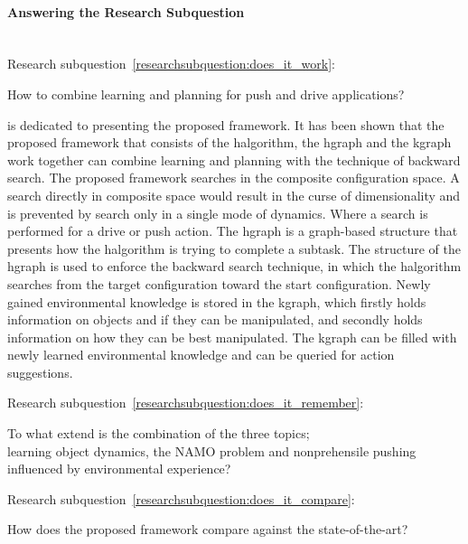 
\paragraph{Answering the Research Subquestion}\mbox{}\\

Research subquestion~\ref{researchsubquestion:does_it_work}:
\begin{center}
\large How to combine learning and planning for push and drive applications?
\end{center}



 is dedicated to presenting the proposed framework. It has been shown that the proposed framework that consists of the \ac{halgorithm}, the \ac{hgraph} and the \ac{kgraph} work together can combine learning and planning with the technique of backward search. The proposed framework searches in the composite configuration space. A search directly in composite space would result in the curse of dimensionality and is prevented by search only in a single mode of dynamics. Where a search is performed for a drive or push action. The \ac{hgraph} is a graph-based structure that presents how the \ac{halgorithm} is trying to complete a subtask. The structure of the \ac{hgraph} is used to enforce the backward search technique, in which the \ac{halgorithm} searches from the target configuration toward the start configuration. Newly gained environmental knowledge is stored in the \ac{kgraph}, which firstly holds information on objects and if they can be manipulated, and secondly holds information on how they can be best manipulated. The \ac{kgraph} can be filled with newly learned environmental knowledge and can be queried for action suggestions.\bs

Research subquestion~\ref{researchsubquestion:does_it_remember}:
\begin{center}
\large To what extend is the combination of the three topics; \\learning object dynamics, the \ac{NAMO} problem and nonprehensile pushing influenced by environmental experience?
\end{center}


Research subquestion~\ref{researchsubquestion:does_it_compare}:
\begin{center}
\large How does the proposed framework compare against the state-of-the-art?
\end{center}

